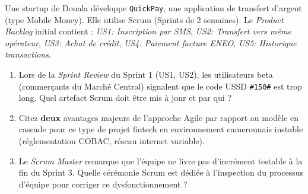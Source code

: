 \documentclass[11pt]{article}
\begin{document}
\begin{exercice}
Une startup de Douala développe \texttt{QuickPay}, une application de transfert d'argent (type Mobile Money). Elle utilise Scrum (Sprints de 2 semaines). Le \textit{Product Backlog} initial contient : \textit{US1: Inscription par SMS}, \textit{US2: Transfert vers même opérateur}, \textit{US3: Achat de crédit}, \textit{US4: Paiement facture ENEO}, \textit{US5: Historique transactions}.
\begin{enumerate}
    \item Lors de la \textit{Sprint Review} du Sprint 1 (US1, US2), les utilisateurs beta (commerçants du Marché Central) signalent que le code USSD \texttt{\#150\#} est trop long. Quel artefact Scrum doit être mis à jour et par qui ?
    \item Citez \textbf{deux} avantages majeurs de l'approche Agile par rapport au modèle en cascade pour ce type de projet fintech en environnement camerounais instable (réglementation COBAC, réseau internet variable).
    \item Le \textit{Scrum Master} remarque que l'équipe ne livre pas d'incrément testable à la fin du Sprint 3. Quelle cérémonie Scrum est dédiée à l'inspection du processus d'équipe pour corriger ce dysfonctionnement ?
\end{enumerate}
\end{exercice}
\end{document}
